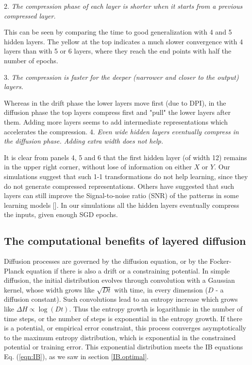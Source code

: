 \documentclass[11pt]{article}
\newcommand\mycomment[1]{} 			     %
\newcommand{\ignore}[1]{}
\begin{document}
2. \emph{The compression phase of each layer is shorter when it starts from a previous compressed layer.}

This can be seen by comparing the time to good generalization with 4 and 5 hidden layers. The yellow at the top indicates a much slower convergence with 4 layers than with 5 or 6 layers, where they reach the end points with half the number of epochs. 

3. \emph{The compression is faster for the deeper (narrower and closer to the output) layers.}

Whereas in the drift phase the lower layers move first (due to DPI), in the diffusion phase the top layers compress first and "pull" the lower layers after them. Adding more layers seems to add intermediate representations which accelerates the compression.   
4. \emph{Even wide hidden layers eventually compress in the diffusion phase. Adding extra width does not help.}

It is clear from panels 4, 5 and 6 that the first hidden layer (of width 12) remains in the upper right corner, without lose of information on either $X$ or $Y$. Our simulations suggest that such 1-1 transformations do not help learning, since they do not generate compressed representations. Others have suggested that such layers can still improve the Signal-to-noise ratio (SNR) of the patterns in some learning models [\citet{Kadmon2016OptimalAI}]. In our simulations all the hidden layers eventually compress the inputs, given enough SGD epochs.  

\subsection{The computational benefits of layered diffusion}
\label{com.benefit}
Diffusion processes are governed by the diffusion equation, or by the Focker-Planck equation if there is also a drift or a constraining potential.  In simple diffusion, the initial distribution evolves through convolution with a Gaussian kernel, whose width grows like $\sqrt{Dt}$ with time, in every dimension ($D$ - a diffusion constant). Such convolutions lead to  an entropy increase which grows like $\Delta H \propto  \log (Dt)$. Thus the entropy growth is logarithmic in the number of time steps, or the number of steps is exponential in the entropy growth.  If there is a potential, or empirical error constraint, this process converges asymptotically to the maximum entropy distribution, which is exponential in the constrained potential or training error. This exponential distribution meets the IB equations Eq. (\ref{eqn:IB}), as we saw in section \ref{IB.optimal}.
\end{document}
